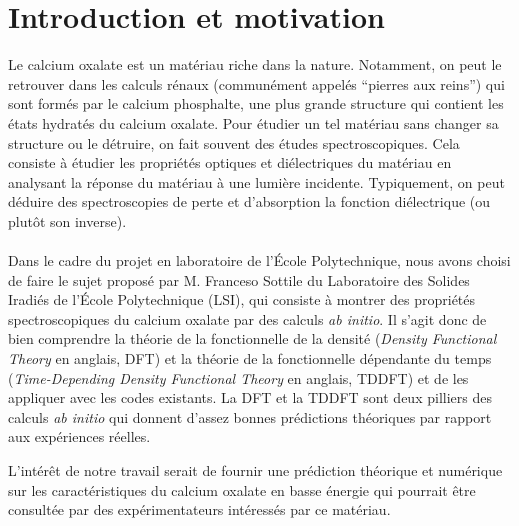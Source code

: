 \chapter{Introduction et motivation}
Le calcium oxalate est un matériau riche dans la nature. Notamment, on peut le retrouver dans les calculs rénaux (communément appelés ``pierres aux reins'') qui sont formés par le calcium phosphalte, une plus grande structure qui contient les états hydratés du calcium oxalate.
Pour étudier un tel matériau sans changer sa structure ou le détruire, on fait souvent des études spectroscopiques.
Cela consiste à étudier les propriétés optiques et diélectriques du matériau en analysant la réponse du matériau à une lumière incidente.
Typiquement, on peut déduire des spectroscopies de perte et d'absorption la fonction diélectrique (ou plutôt son inverse).
\\\\Dans le cadre du projet en laboratoire de l'École Polytechnique, nous avons choisi de faire le sujet proposé par M. Franceso Sottile du Laboratoire des Solides Iradiés de l'École Polytechnique (LSI), qui consiste à montrer des propriétés spectroscopiques du calcium oxalate par des calculs \textit{ab initio}.
Il s'agit donc de bien comprendre la théorie de la fonctionnelle de la densité (\textit{Density Functional Theory} en anglais, DFT) et la théorie de la fonctionnelle dépendante du temps (\textit{Time-Depending Density Functional Theory} en anglais, TDDFT) et de les appliquer avec les codes existants.
La DFT et la TDDFT sont deux pilliers des calculs \textit{ab initio} qui donnent d'assez bonnes prédictions théoriques par rapport aux expériences réelles.

L'intérêt de notre travail serait de fournir une prédiction théorique et numérique sur les caractéristiques du calcium oxalate en basse énergie qui pourrait être consultée par des expérimentateurs intéressés par ce matériau.
